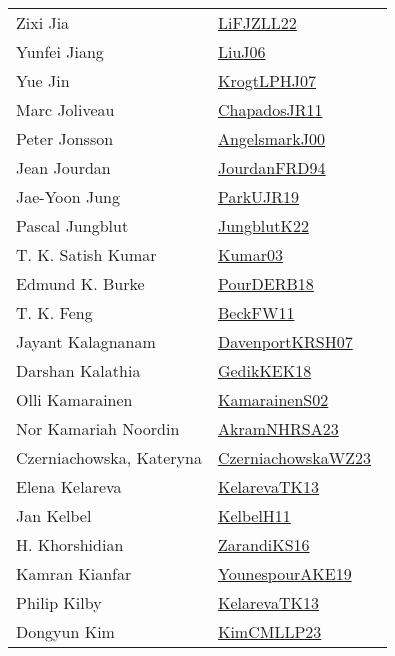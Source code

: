 {\begin{longtable}{p{4cm}p{20cm}}
Zixi Jia & \href{works/LiFJZLL22.pdf}{LiFJZLL22}~\cite{LiFJZLL22}\\
Yunfei Jiang & \href{works/LiuJ06.pdf}{LiuJ06}~\cite{LiuJ06}\\
Yue Jin & \href{works/KrogtLPHJ07.pdf}{KrogtLPHJ07}~\cite{KrogtLPHJ07}\\
Marc Joliveau & \href{works/ChapadosJR11.pdf}{ChapadosJR11}~\cite{ChapadosJR11}\\
Peter Jonsson & \href{works/AngelsmarkJ00.pdf}{AngelsmarkJ00}~\cite{AngelsmarkJ00}\\
Jean Jourdan & \href{}{JourdanFRD94}~\cite{JourdanFRD94}\\
Jae{-}Yoon Jung & \href{works/ParkUJR19.pdf}{ParkUJR19}~\cite{ParkUJR19}\\
Pascal Jungblut & \href{works/JungblutK22.pdf}{JungblutK22}~\cite{JungblutK22}\\
T. K. Satish Kumar & \href{works/Kumar03.pdf}{Kumar03}~\cite{Kumar03}\\
Edmund K. Burke & \href{works/PourDERB18.pdf}{PourDERB18}~\cite{PourDERB18}\\
T. K. Feng & \href{works/BeckFW11.pdf}{BeckFW11}~\cite{BeckFW11}\\
Jayant Kalagnanam & \href{works/DavenportKRSH07.pdf}{DavenportKRSH07}~\cite{DavenportKRSH07}\\
Darshan Kalathia & \href{works/GedikKEK18.pdf}{GedikKEK18}~\cite{GedikKEK18}\\
Olli Kamarainen & \href{works/KamarainenS02.pdf}{KamarainenS02}~\cite{KamarainenS02}\\
Nor Kamariah Noordin & \href{works/AkramNHRSA23.pdf}{AkramNHRSA23}~\cite{AkramNHRSA23}\\
Czerniachowska, Kateryna & \href{works/CzerniachowskaWZ23.pdf}{CzerniachowskaWZ23}~\cite{CzerniachowskaWZ23}\\
Elena Kelareva & \href{works/KelarevaTK13.pdf}{KelarevaTK13}~\cite{KelarevaTK13}\\
Jan Kelbel & \href{works/KelbelH11.pdf}{KelbelH11}~\cite{KelbelH11}\\
H. Khorshidian & \href{works/ZarandiKS16.pdf}{ZarandiKS16}~\cite{ZarandiKS16}\\
Kamran Kianfar & \href{works/YounespourAKE19.pdf}{YounespourAKE19}~\cite{YounespourAKE19}\\
Philip Kilby & \href{works/KelarevaTK13.pdf}{KelarevaTK13}~\cite{KelarevaTK13}\\
Dongyun Kim & \href{works/KimCMLLP23.pdf}{KimCMLLP23}~\cite{KimCMLLP23}\\

\end{longtable}}
